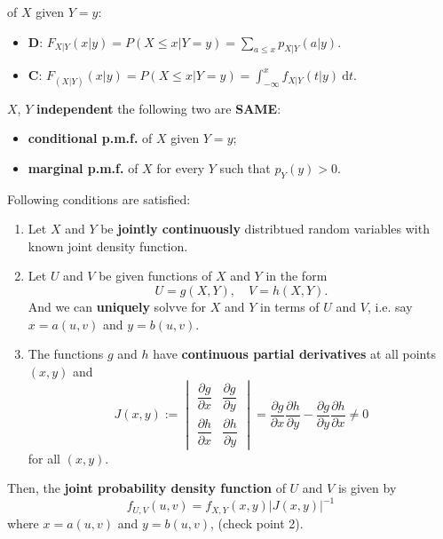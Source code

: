  of \(X\) given \(Y = y\):
\begin{itemize}
  \item \textbf{D}: \(F_{X|Y}(x|y) = P(X \leq x|Y = y) = \sum\limits_{a\leq
    x}p_{X|Y}(a|y).\)
  \item \textbf{C}: \(F_{(X|Y)}(x|y) = P(X \leq x |Y=y) = \int_{-\infty}^{x}f_{X|Y}(t|y)\
    \mathrm{d}t.\)
\end{itemize} 

 \(X\), \(Y\) 
\textbf{independent} \tf the following two are \textbf{SAME}: 
\begin{itemize}
  \item \textbf{conditional p.m.f.} of \(X\) given \(Y = y\);
  \item \textbf{marginal p.m.f.} of \(X\) for every \(Y\) such that \(p_Y(y)>
    0\).
\end{itemize}

 Following conditions are satisfied:
\begin{enumerate}
  \item Let \(X\) and \(Y\) be \textbf{jointly continuously} distribtued random
    variables with known joint density function.
  \item Let \(U\) and \(V\) be given functions of \(X\) and \(Y\) in the
    form \[U = g(X, Y),\quad V = h(X, Y).\] And we can \textbf{uniquely} solvve
    for \(X\) and \(Y\) in terms of \(U\) and \(V\), i.e. say \(x = a(u, v)\)
    and \(y = b(u, v)\).
  \item The functions \(g\) and \(h\) have \textbf{continuous partial
    derivatives} at all points \((x, y)\) and \[J(x,y):=\begin{vmatrix}
      \dfrac{\partial g}{\partial x} & \dfrac{\partial g}{\partial y} \\
      \dfrac{\partial h}{\partial x} & \dfrac{\partial h}{\partial y}
    \end{vmatrix} = \dfrac{\partial g}{\partial x} \dfrac{\partial
    h}{\partial y} - \dfrac{\partial g}{\partial y} \dfrac{\partial
  h}{\partial x} \neq 0\] for all \((x, y)\).
\end{enumerate}
Then, the \textbf{joint probability density function} of \(U\) and \(V\) is
given by 
\[f_{U,V}(u,v) = f_{X,Y}(x,y)|J(x,y)|^{-1}\]
where \(x = a(u, v)\) and \(y = b(u, v)\), (check point 2).


